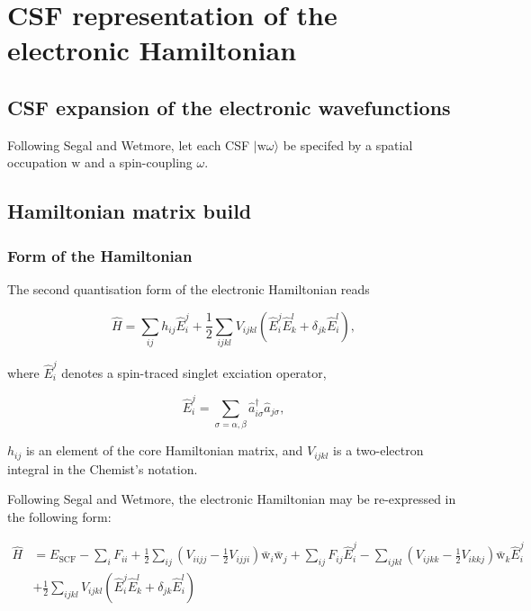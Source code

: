 \documentclass[12pt,a4paper]{report}
\begin{document}
\chapter{CSF representation of the electronic Hamiltonian}
\section{CSF expansion of the electronic wavefunctions}
Following Segal and Wetmore\cite{segal_ci_matrix_elements_1975}, let
each CSF $| \text{w} \omega \rangle$ be specifed by a spatial
occupation $\text{w}$ and a spin-coupling $\omega$.

\section{Hamiltonian matrix build}
\subsection{Form of the Hamiltonian}
The second quantisation form of the electronic Hamiltonian reads

\begin{equation}
  \hat{H} = \sum_{ij} h_{ij} \hat{E}_{i}^{j} + \frac{1}{2} \sum_{ijkl}
  V_{ijkl} \left( \hat{E}_{i}^{j} \hat{E}_{k}^{l} + \delta_{jk}
  \hat{E}_{i}^{l} \right),
\end{equation}

\noindent
where $\hat{E}_{i}^{j}$ denotes a spin-traced singlet exciation
operator,

\begin{equation}
  \hat{E}_{i}^{j} = \sum_{\sigma=\alpha,\beta}
  \hat{a}_{i\sigma}^{\dagger} \hat{a}_{j\sigma},
\end{equation}

\noindent
$h_{ij}$ is an element of the core Hamiltonian matrix, and $V_{ijkl}$
is a two-electron integral in the Chemist's notation.

Following Segal and Wetmore\cite{segal_ci_matrix_elements_1975}, the
electronic Hamiltonian may be re-expressed in the following form:

\begin{equation}\label{eq:ham_segal}
  \begin{aligned}
    \hat{H} &= E_{\text{SCF}} - \sum_{i} F_{ii} + \frac{1}{2}
    \sum_{ij} \left(V_{iijj} - \frac{1}{2} V_{ijji} \right)
    \bar{\text{w}}_{i} \bar{\text{w}}_{j} + \sum_{ij} F_{ij}
    \hat{E}_{i}^{j} - \sum_{ijkl} \left( V_{ijkk} - \frac{1}{2}
    V_{ikkj} \right) \bar{\text{w}}_{k} \hat{E}_{i}^{j} \\
    &+ \frac{1}{2} \sum_{ijkl} V_{ijkl} \left( \hat{E}_{i}^{j}
    \hat{E}_{k}^{l} + \delta_{jk} \hat{E}_{i}^{l} \right)
  \end{aligned}
\end{equation}
\end{document}
